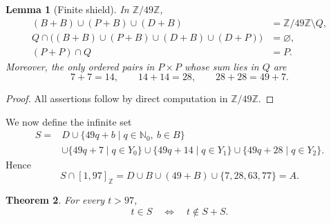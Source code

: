 \documentclass[11pt,letterpaper]{article}
\newtheorem{theorem}{Theorem}[section]
\newtheorem{lemma}[theorem]{Lemma}
\newcommand{\Nzero}{\mathbb{N}_0}
\newcommand{\Zfortynine}{\mathbb{Z}/49\mathbb{Z}}
\newcommand{\ints}[2]{[#1,#2]_{\mathbb{Z}}}
\begin{document}
\begin{lemma}[Finite shield]\label{lem:shield}
In \(\Zfortynine\),
\begin{align}
(B+B)\cup(P+B)\cup(D+B)&=\Zfortynine\setminus Q, \label{eq:cover-mod}\\
Q\cap\bigl((B+B)\cup(P+B)\cup(D+B)\cup(D+P)\bigr)
&=\varnothing,                                         \label{eq:avoid-mod}\\
(P+P)\cap Q&=P.                                        \label{eq:PP-mod}
\end{align}
Moreover, the only ordered pairs in \(P\times P\) whose sum lies in \(Q\) are
\begin{equation}\label{eq:diagonal-pairs}
7+7=14,
\qquad
14+14=28,
\qquad
28+28=49+7.
\end{equation}
\end{lemma}

\begin{proof}
All assertions follow by direct computation in \(\Zfortynine\).
\end{proof}

We now define the infinite set
\begin{equation}\label{eq:S}
\begin{split}
S={}&D\cup\{49q+b\mid q\in\Nzero,\ b\in B\}\\
&\cup\{49q+7\mid q\in Y_0\}
 \cup\{49q+14\mid q\in Y_1\}
 \cup\{49q+28\mid q\in Y_2\}.
\end{split}
\end{equation}
Hence
\begin{equation}\label{eq:seed-prefix}
S\cap\ints{1}{97}=D\cup B\cup(49+B)\cup\{7,28,63,77\}=A.
\end{equation}

\begin{theorem}\label{thm:recurrence}
For every \(t>97\),
\begin{equation}\label{eq:main-recurrence}
t\in S
\quad\Longleftrightarrow\quad
t\notin S+S.
\end{equation}
\end{theorem}
\end{document}
